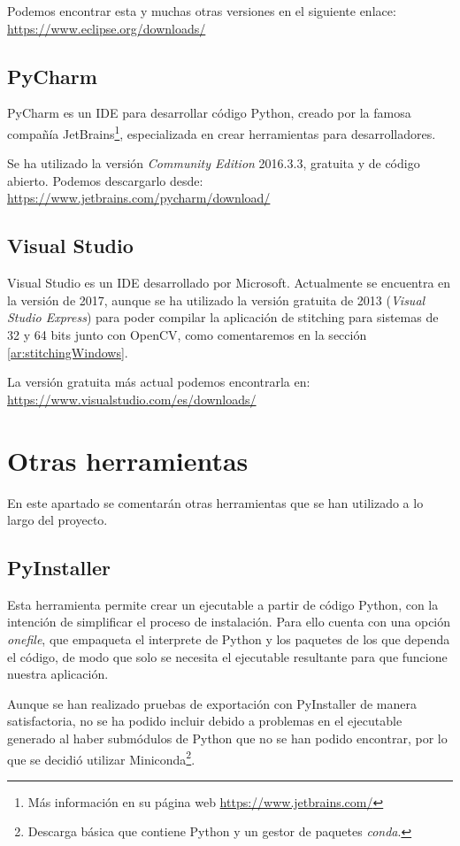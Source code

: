 Podemos encontrar esta y muchas otras versiones en el siguiente enlace: \url{https://www.eclipse.org/downloads/}

\subsection{PyCharm} \label{th:PyCharm}
PyCharm es un IDE para desarrollar código Python, creado por la famosa compañía JetBrains\footnote{Más información en su página web \url{https://www.jetbrains.com/}}, especializada en crear herramientas para desarrolladores. 

Se ha utilizado la versión \textit{Community Edition} 2016.3.3, gratuita y de código abierto. Podemos descargarlo desde:
\url{https://www.jetbrains.com/pycharm/download/}

\subsection{Visual Studio}\label{th:VisualStudio}
Visual Studio es un IDE desarrollado por Microsoft. Actualmente se encuentra en la versión de 2017, aunque se ha utilizado la versión gratuita de 2013 (\textit{Visual Studio Express}) para poder compilar la aplicación de stitching para sistemas de 32 y 64 bits junto con OpenCV, como comentaremos en la sección \ref{ar:stitchingWindows}.

La versión gratuita más actual podemos encontrarla en: \url{https://www.visualstudio.com/es/downloads/}

\section{Otras herramientas}
En este apartado se comentarán otras herramientas que se han utilizado a lo largo del proyecto.

\subsection{PyInstaller} \label{th:PyInstaller}
Esta herramienta permite crear un ejecutable a partir de código Python, con la intención de simplificar el proceso de instalación. Para ello cuenta con una opción \textit{onefile}, que empaqueta el interprete de Python y los paquetes de los que dependa el código, de modo que solo se necesita el ejecutable resultante para que funcione nuestra aplicación.

Aunque se han realizado pruebas de exportación con PyInstaller de manera satisfactoria, no se ha podido incluir debido a problemas en el ejecutable generado al haber submódulos de Python que no se han podido encontrar, por lo que se decidió utilizar Miniconda\footnote{Descarga básica que contiene Python y un gestor de paquetes \textit{conda}.}.

